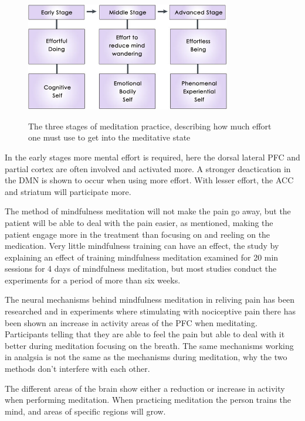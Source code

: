 \begin{figure}[H]
	\includegraphics[width=0.8\textwidth]{figures/stages_of_meditation.png} 
	\caption{The three stages of meditation practice, describing how much effort one must use to get into the meditative state}
	\label{fig:meditation_stages}  
	\cite{Tang2017}
\end{figure}  \cite{Tang2017}

In the early stages more mental effort is required, here the dorsal lateral PFC and partial cortex are often involved and activated more. A stronger deactication in the DMN is shown to occur when using more effort. With lesser effort, the ACC and striatum will participate more. \cite{Tang2017}

The method of mindfulness meditation will not make the pain go away, but the patient will be able to deal with the pain easier, as mentioned, making the patient engage more in the treatment than focusing on and reeling on the medication. \cite{Jacob2016}
Very little mindfulness training can have an effect, the study by \cite{Zeidan2012} explaining an effect of training mindfulness meditation examined for 20 min sessions for 4 days of mindfulness meditation, but most studies conduct the experiments for a period of more than six weeks. \cite{Zeidan2012}

The neural mechanisms behind mindfulness meditation in reliving pain has been researched and in experiments where stimulating with nociceptive pain there has been shown an increase in activity areas of the PFC when meditating. Participants telling that they are able to feel the pain but able to deal with it better during meditation focusing on the breath. 
The same mechanisms working in analgsia is not the same as the mechanisms during meditation, why the two methods don't interfere with each other. \cite{Jacob2016}

The different areas of the brain show either a reduction or increase in activity when performing meditation. When practicing meditation the person trains the mind, and areas of specific regions will grow. \cite{Zeidan2012}

